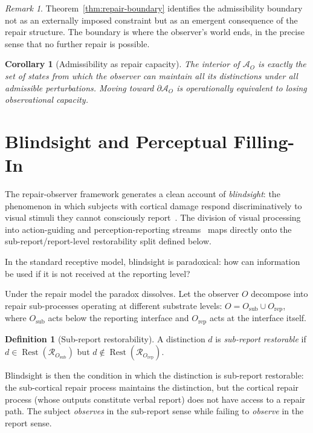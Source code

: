 \documentclass[12pt, oneside]{article}
\theoremstyle{plain}
\newtheorem{corollary}[theorem]{Corollary}
\theoremstyle{definition}
\newtheorem{definition}[theorem]{Definition}
\theoremstyle{remark}
\newtheorem{remark}[theorem]{Remark}
\theoremstyle{definition}
\DeclareMathOperator{\Rest}{Rest}
\newcommand{\AO}{\mathcal{A}_O}
\newcommand{\bA}{\partial\mathcal{A}}
\begin{document}
\begin{remark}
  Theorem~\ref{thm:repair-boundary} identifies the admissibility
  boundary not as an externally imposed constraint but as an emergent
  consequence of the repair structure.
  The boundary is where the observer's world ends, in the precise sense
  that no further repair is possible.
\end{remark}

\begin{corollary}[Admissibility as repair capacity]
  The interior of $\AO$ is exactly the set of states from which the
  observer can maintain all its distinctions under all admissible
  perturbations.
  Moving toward $\bA_O$ is operationally equivalent to losing
  observational capacity.
\end{corollary}


\section{Blindsight and Perceptual Filling-In}
\label{sec:blindsight}

The repair-observer framework generates a clean account of
\emph{blindsight}: the phenomenon in which subjects with cortical
damage respond discriminatively to visual stimuli they cannot
consciously report~\cite{Weiskrantz1986}.
The division of visual processing into action-guiding and
perception-reporting streams~\cite{MilnerGoodale2006} maps directly
onto the sub-report/report-level restorability split defined below.

In the standard receptive model, blindsight is paradoxical: how can
information be used if it is not received at the reporting level?

Under the repair model the paradox dissolves.
Let the observer $O$ decompose into repair sub-processes operating at
different substrate levels: $O = O_{\mathrm{sub}} \cup O_{\mathrm{rep}}$,
where $O_{\mathrm{sub}}$ acts below the reporting interface and
$O_{\mathrm{rep}}$ acts at the interface itself.

\begin{definition}[Sub-report restorability]
  A distinction $d$ is \emph{sub-report restorable} if
  $d \in \Rest(\mathcal{R}_{O_{\mathrm{sub}}})$ but
  $d \notin \Rest(\mathcal{R}_{O_{\mathrm{rep}}})$.
\end{definition}

Blindsight is then the condition in which the distinction is
sub-report restorable: the sub-cortical repair process maintains the
distinction, but the cortical repair process (whose outputs constitute
verbal report) does not have access to a repair path.
The subject \emph{observes} in the sub-report sense while failing to
\emph{observe} in the report sense.
\end{document}
